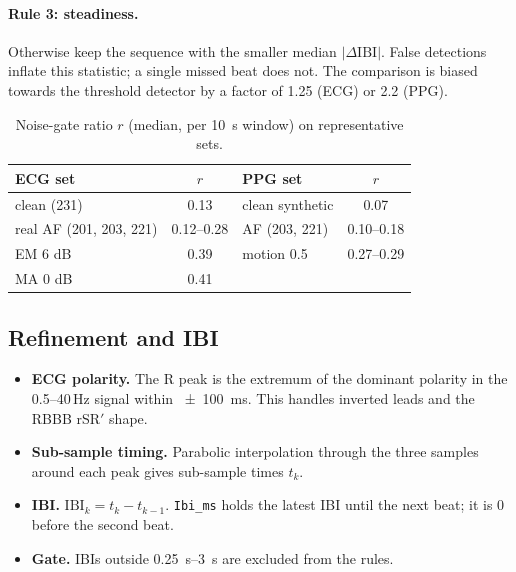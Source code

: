 \documentclass[10pt,a4paper]{article}
\newcommand{\code}[1]{\texttt{#1}}
\newcommand{\ibi}{\mathrm{IBI}}
\begin{document}
\paragraph{Rule 3: steadiness.}
Otherwise keep the sequence with the smaller median $|\Delta\ibi|$. False detections inflate this statistic; a single
missed beat does not. The comparison is biased towards the threshold detector by a factor of 1.25 (ECG) or 2.2 (PPG).

\begin{table}[h]
\centering\small
\caption{Noise-gate ratio $r$ (median, per \SI{10}{s} window) on representative sets.}
\label{tab:gate}
\begin{tabular}{lc@{\qquad}lc}
\toprule
ECG set & $r$ & PPG set & $r$\\
\midrule
clean (231) & 0.13 & clean synthetic & 0.07\\
real AF (201, 203, 221) & 0.12--0.28 & AF (203, 221) & 0.10--0.18\\
EM 6 dB & 0.39 & motion 0.5 & 0.27--0.29\\
MA 0 dB & 0.41 & & \\
\bottomrule
\end{tabular}
\end{table}

\subsection{Refinement and IBI}
\begin{itemize}
  \item \textbf{ECG polarity.} The R peak is the extremum of the dominant polarity in the 0.5--40\,Hz signal within
        \SI{\pm100}{ms}. This handles inverted leads and the RBBB rSR$'$ shape.
  \item \textbf{Sub-sample timing.} Parabolic interpolation through the three samples around each peak gives
        sub-sample times $t_k$.
  \item \textbf{IBI.} $\ibi_k=t_k-t_{k-1}$. \code{Ibi\_ms} holds the latest IBI until the next beat; it is 0 before the
        second beat.
  \item \textbf{Gate.} IBIs outside \SIrange{0.25}{3}{s} are excluded from the rules.
\end{itemize}

\end{document}

